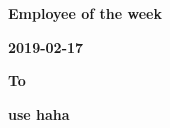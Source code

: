 \documentclass{article}
\begin{document}
        \begin{center}
        \begin{center}{\huge\textbf{Employee of the week}}\end{center}\begin{center}{\large\textbf{2019-02-17}}\end{center}\begin{center}{\large\textbf{To}}\end{center}\begin{center}{\Huge\textbf{use haha}}\end{center}   \end{center}
                        
\end{document}

